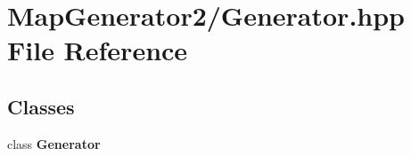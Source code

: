 \section{Map\-Generator2/\-Generator.hpp File Reference}
\label{_generator_8hpp}
\subsection*{Classes}
\begin{DoxyCompactItemize}
\item 
class {\bf Generator}
\end{DoxyCompactItemize}
